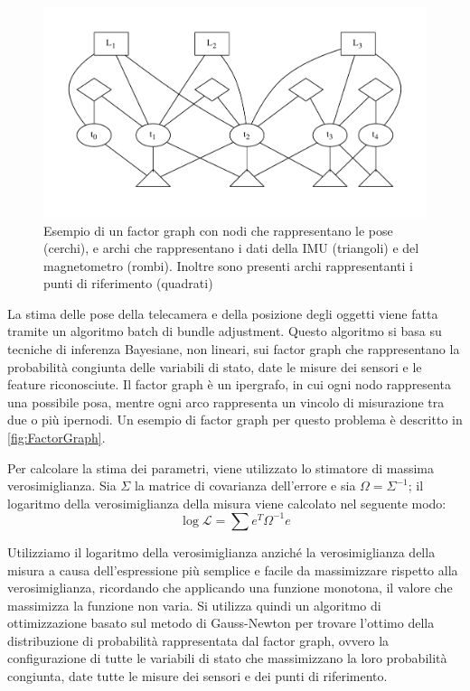 \begin{figure}[ht]
  \includegraphics[width=\textwidth]{diagrammi/FactorGraph}
  \caption[Esempio di Factor Graph]{Esempio di un factor graph con nodi che rappresentano le pose (cerchi), e archi che rappresentano i dati della IMU (triangoli) e del magnetometro (rombi). Inoltre sono presenti archi rappresentanti i punti di riferimento (quadrati) }
  \label{fig:FactorGraph}
\end{figure}

La stima delle pose della telecamera e della posizione degli oggetti viene fatta tramite un algoritmo batch di bundle adjustment.
Questo algoritmo si basa su tecniche di inferenza Bayesiane, non lineari, sui factor graph che rappresentano la probabilità congiunta delle variabili di stato, date le misure dei sensori e le feature riconosciute.
Il factor graph è un ipergrafo, in cui ogni nodo rappresenta una possibile posa, mentre ogni arco rappresenta un vincolo di misurazione tra due o più ipernodi. Un esempio di factor graph per questo problema è descritto in \autoref{fig:FactorGraph}.

Per calcolare la stima dei parametri, viene utilizzato lo stimatore di massima verosimiglianza. Sia $\Sigma$ la matrice di covarianza dell'errore e sia $\Omega = \Sigma^{-1}$; il logaritmo della verosimiglianza della misura viene calcolato nel seguente modo:
\begin{equation*}
 \log\mathcal{L}=\sum e^{T}\Omega^{-1}e
\end{equation*}

Utilizziamo il logaritmo della verosimiglianza anziché la verosimiglianza della misura a causa dell'espressione più semplice e facile da massimizzare rispetto alla verosimiglianza, ricordando che applicando una funzione monotona, il valore che massimizza la funzione non varia.
Si utilizza quindi un algoritmo di ottimizzazione basato sul metodo di Gauss-Newton per trovare l'ottimo della distribuzione di probabilità rappresentata dal factor graph, ovvero la configurazione di tutte le variabili di stato che massimizzano la loro probabilità congiunta, date tutte le misure dei sensori e dei punti di riferimento.

